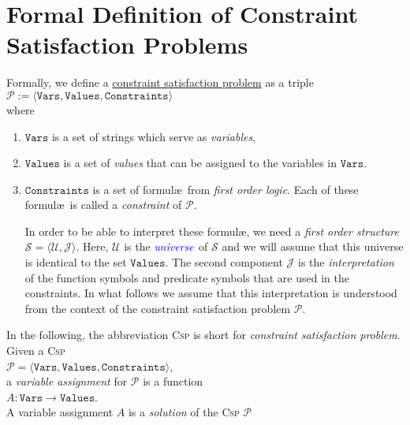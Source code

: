 \section{Formal Definition of Constraint Satisfaction Problems}
Formally, we define a 
\href{https://en.wikipedia.org/wiki/Constraint_satisfaction_problem}{constraint satisfaction problem} as a triple
\\[0.2cm]
\hspace*{1.3cm}
$\mathcal{P} := \langle \mathtt{Vars}, \mathtt{Values}, \mathtt{Constraints} \rangle$
\\[0.2cm]
where
\begin{enumerate}
\item $\mathtt{Vars}$ is a set of strings which serve as \emph{\color{blue}variables},
\item $\mathtt{Values}$ is a set of \emph{\color{blue}values} that can be assigned to the variables in $\mathtt{Vars}$.
\item $\mathtt{Constraints}$ is a set of formul\ae\ from \emph{\color{blue}first order logic}.  Each of these formul\ae\ is
      called a \emph{\color{blue}constraint} of $\mathcal{P}$.

      In order to be able to interpret these formul\ae, we need a \emph{\color{blue}first order structure} $\mathcal{S} = \langle \mathcal{U}, \mathcal{J} \rangle$.  
      Here, $\mathcal{U}$ is the $\emph{\color{blue}universe}$ of $\mathcal{S}$ and we will assume that this
      universe is identical to the set $\mathtt{Values}$. The second component $\mathcal{J}$ is the
      \emph{\color{blue}interpretation} of the function symbols and predicate symbols that are used in the 
      constraints.  In what follows we assume that this interpretation is understood from the context of the
      constraint satisfaction problem $\mathcal{P}$.
\end{enumerate}
In the following, the abbreviation \textsc{Csp} is short for \emph{\color{blue}constraint satisfaction problem}.
Given a \textsc{Csp}
\\[0.2cm]
\hspace*{1.3cm}
 $\mathcal{P} = \langle \mathtt{Vars}, \mathtt{Values}, \mathtt{Constraints} \rangle$, 
\\[0.2cm]
a \emph{\color{blue}variable assignment} for $\mathcal{P}$ is a function
\\[0.2cm]
\hspace*{1.3cm}
$A: \mathtt{Vars} \rightarrow \mathtt{Values}$.
\\[0.2cm]
A variable assignment $A$ is a \emph{\color{blue}solution} of the \textsc{Csp} $\mathcal{P}$ 
